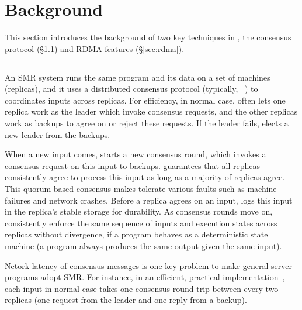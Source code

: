 \section{Background}\label{sec:background}

This section introduces the background of two key techniques in \xxx, the 
\paxos consensus protocol (\S\ref{sec:paxos}) and RDMA features 
(\S\ref{sec:rdma}).

\subsection{\paxos}\label{sec:paxos}
An SMR system runs the same program and its data on a set of machines 
(replicas), and it uses a distributed consensus protocol (typically, 
\paxos~\cite{paxos:complex,paxos,paxos:simple,paxos:live,paxos:fast,
paxos:practical}) to coordinates inputs across replicas. For efficiency, in 
normal case, \paxos often lets one replica work as the leader which invoke 
consensus requests, and the other replicas work as backups to agree on or reject 
these requests. If the leader fails, \paxos elects a new leader from the 
backups.

When a new input comes, \paxos starts a new consensus round, which invokes a 
consensus request on this input to backups. \paxos guarantees that all replicas 
consistently agree to process this input as long as a majority of replicas 
agree. This quorum based consensus makes \paxos tolerate various faults such as 
machine failures and network crashes. Before a replica agrees on an input, 
\paxos logs this input in the replica's stable storage for durability. As 
consensus rounds move on, \paxos consistently enforce the same sequence of 
inputs and execution states across replicas without divergence, if a program 
behaves as a deterministic state machine (a program always produces the 
same output given the same input).

Netork latency of consensus messages is one key problem to make general server 
programs adopt SMR. For instance, in an efficient, practical 
\paxos implementation~\cite{paxos:practical}, each input in normal case takes 
one consensus round-trip between every two replicas (one request from the leader 
and one reply from a backup).


